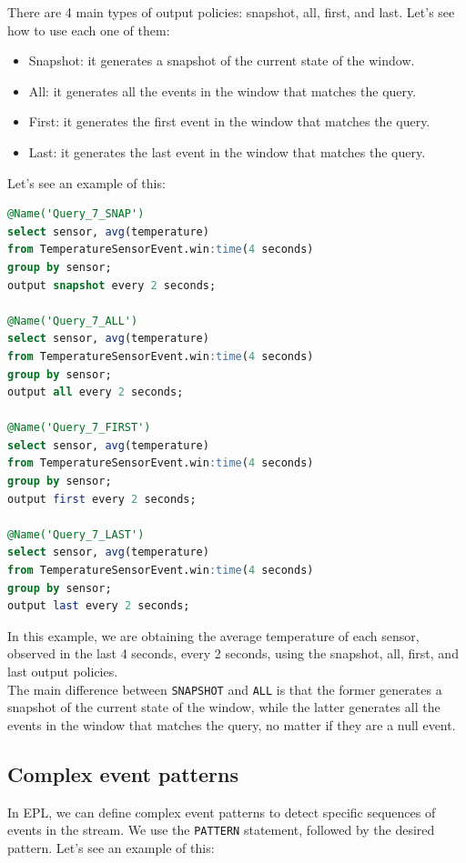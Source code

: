 There are 4 main types of output policies: snapshot, all, first, and last.
Let's see how to use each one of them:

\begin{itemize}
    \item Snapshot: it generates a snapshot of the current state of the window.
    \item All: it generates all the events in the window that matches the query.
    \item First: it generates the first event in the window that matches the query.
    \item Last: it generates the last event in the window that matches the query.
\end{itemize}

Let's see an example of this:\\

\begin{lstlisting}[language=SQL]
@Name('Query_7_SNAP')
select sensor, avg(temperature)
from TemperatureSensorEvent.win:time(4 seconds)
group by sensor;
output snapshot every 2 seconds;

@Name('Query_7_ALL')
select sensor, avg(temperature)
from TemperatureSensorEvent.win:time(4 seconds)
group by sensor;
output all every 2 seconds;

@Name('Query_7_FIRST')
select sensor, avg(temperature)
from TemperatureSensorEvent.win:time(4 seconds)
group by sensor;
output first every 2 seconds;

@Name('Query_7_LAST')
select sensor, avg(temperature)
from TemperatureSensorEvent.win:time(4 seconds)
group by sensor;
output last every 2 seconds;
\end{lstlisting}

In this example, we are obtaining the average temperature of each sensor, observed
in the last 4 seconds, every 2 seconds, using the snapshot, all, first, and last
output policies.\\

The main difference between \texttt{SNAPSHOT} and \texttt{ALL} is that the former
generates a snapshot of the current state of the window, while the latter generates
all the events in the window that matches the query, no matter if they are a null 
event.

\subsection{Complex event patterns}

In EPL, we can define complex event patterns to detect specific sequences of events
in the stream. We use the \texttt{PATTERN} statement, followed by the desired pattern.
Let's see an example of this:\\

